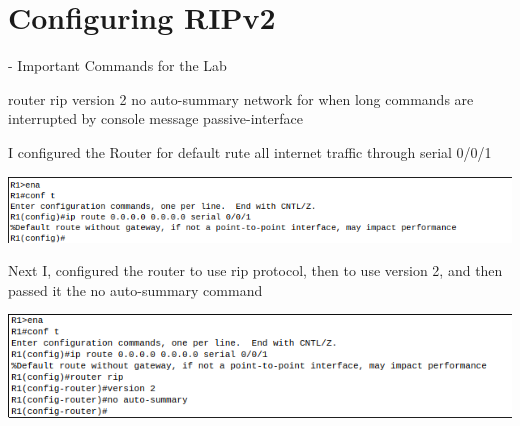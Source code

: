 \documentclass[../EngineeringJournal_CDavis.tex]{subfiles}
\begin{document}

\chapter[Configuring RIPv2]{Configuring \linebreak[1] RIPv2 \hspace*{\fill}{Jan 31, 2020}}

\hspace{0.2cm}
\begin{tcolorbox}[width=6.3in]
\scriptsize 
- Important Commands for the Lab
  \begin{outline}
    \1 router rip 
      \2 version 2
    \1 no auto-summary
    \1 network
      \2 for when long commands are interrupted by console message
    \1 passive-interface 
  \end{outline}
\end{tcolorbox}
\hspace{0.2cm}
\normalsize  

\newpage

I configured the Router for default rute all internet traffic through serial 0/0/1

\begin{center}
  \includegraphics[scale=0.4]{Figures/2020-01-31-025239_663x87_scrot.png}
\end{center}

Next I, configured the router to use rip protocol, then to use version 2, and then passed it the no auto-summary command

\begin{center}
  \includegraphics[scale=0.4]{Figures/2020-01-31-025628_622x128_scrot.png}
\end{center}
\end{document}
